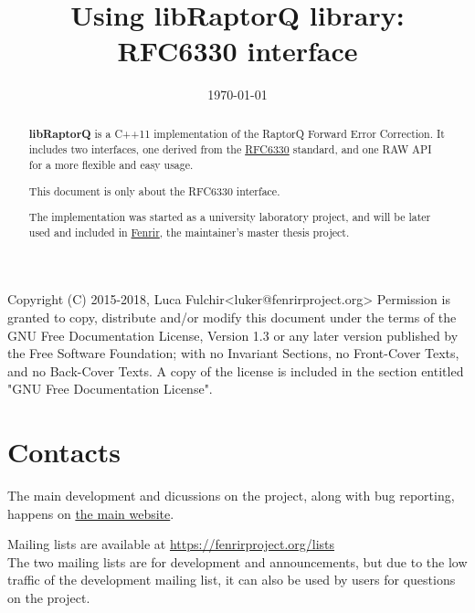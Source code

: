 \documentclass[11pt,a4paper]{refart}
\title{Using libRaptorQ library: RFC6330 interface}
\date{\today}
\begin{document}
\maketitle

\begin{abstract}

\textbf{libRaptorQ} is a C++11 implementation of the RaptorQ Forward Error Correction. It includes two interfaces, one derived from the \href{https://tools.ietf.org/html/rfc6330}{RFC6330} standard, and one RAW API for a more flexible and easy usage.

This document is only about the RFC6330 interface.

The implementation was started as a university laboratory project, and will be later used and included in \href{https://www.fenrirproject.org}{Fenrir}, the
maintainer's master thesis project.



\end{abstract}

\vfill\hfill
\begin{verbbox}[\tiny]
Copyright (C)  2015-2018, Luca Fulchir<luker@fenrirproject.org>
Permission is granted to copy, distribute and/or modify this document
under the terms of the GNU Free Documentation License, Version 1.3
or any later version published by the Free Software Foundation;
with no Invariant Sections, no Front-Cover Texts, and no Back-Cover Texts.
A copy of the license is included in the section entitled "GNU
Free Documentation License".
\end{verbbox}
\theverbbox

\newpage
\tableofcontents
\newpage


\section{Contacts}

The main development and dicussions on the project, along with bug reporting, happens on
\href{https://fenrirproject.org/Luker/libRaptorQ}{the main website}.

 Mailing lists are available at \href{https://fenrirproject.org/lists}{https://fenrirproject.org/lists}\\
The two mailing lists are for development and announcements, but due to the low traffic of the development mailing list, it
can also be used by users for questions on the project.
\end{document}
